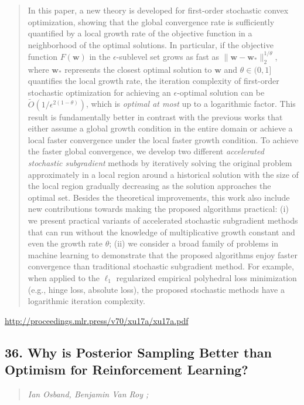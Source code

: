 \documentclass{article}
\begin{document}
\begin{quote}
    In this paper, a new theory is developed for first-order stochastic convex optimization, showing that the global convergence rate is sufficiently quantified by a local growth rate of the objective function in a neighborhood of the optimal solutions. In particular, if the objective function $F(\mathbf{w})$ in the $\epsilon$-sublevel set grows as fast as $\|\mathbf{w} - \mathbf{w}_*\|_2^{1/\theta}$, where $\mathbf{w}_*$ represents the closest optimal solution to $\mathbf{w}$ and $\theta\in(0,1]$ quantifies the local growth rate, the iteration complexity of first-order stochastic optimization for achieving an $\epsilon$-optimal solution can be $\widetilde O(1/\epsilon^{2(1-\theta)})$, which is \textit{optimal at most} up to a logarithmic factor. This result is fundamentally better in contrast with the previous works that either assume a global growth condition in the entire domain or achieve a local faster convergence under the local faster growth condition. To achieve the faster global convergence, we develop two different \textit{accelerated stochastic subgradient} methods by iteratively solving the original problem approximately in a local region around a historical solution with the size of the local region gradually decreasing as the solution approaches the optimal set. Besides the theoretical improvements, this work also include new contributions towards making the proposed algorithms practical: (i) we present practical variants of accelerated stochastic subgradient methods that can run without the knowledge of multiplicative growth constant and even the growth rate $\theta$; (ii) we consider a broad family of problems in machine learning to demonstrate that the proposed algorithms enjoy faster convergence than traditional stochastic subgradient method. For example, when applied to the $\ell_1$ regularized empirical polyhedral loss minimization (e.g., hinge loss, absolute loss), the proposed stochastic methods have a logarithmic iteration complexity.  \end{quote}

\href{http://proceedings.mlr.press/v70/xu17a/xu17a.pdf}{http://proceedings.mlr.press/v70/xu17a/xu17a.pdf}

\subsection{36. Why is Posterior Sampling Better than Optimism for Reinforcement Learning?}

\begin{quote}
\footnotesize{\textit{Ian Osband, Benjamin Van Roy ;}}
\end{quote}
\end{document}

